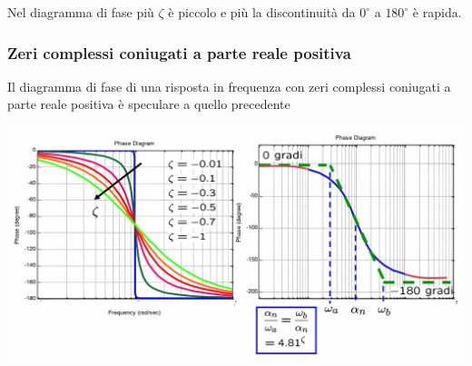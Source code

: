 \documentclass{article}
\numberwithin{equation}{subsection}
\begin{document}
Nel diagramma di fase più $\zeta$ è piccolo e più la discontinuità da $0^\circ$ a $180^\circ$ è rapida. 



\subsubsection{Zeri complessi coniugati a parte reale positiva}
Il diagramma di fase di una risposta in frequenza con zeri complessi coniugati a parte reale positiva è speculare a quello precedente
\begin{center}
    \includegraphics[scale=0.15]{Images/Diagramma_zeri_cc_pos_1.png}
\end{center}
\end{document}
